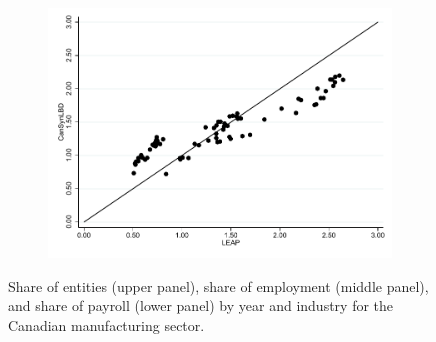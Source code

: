 \begin{figure}[H]
\begin{subfigure}[h]{0.5\linewidth}
\includegraphics[trim=0 0 0 -20,clip,width=\linewidth]{graphs/Share_of_payroll_by_NAICS_two-digit_and_year_Manufacturing_bw.pdf}
\end{subfigure}
\caption{Share of entities (upper panel), share of employment (middle panel), and share of payroll (lower panel) by year and industry for the Canadian manufacturing sector.}\label{fig:FirmShare_manufac}
\end{figure}








